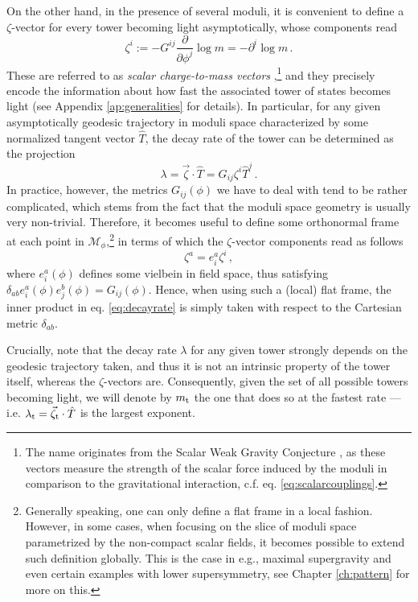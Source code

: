 On the other hand, in the presence of several moduli, it is convenient to define a $\zeta$-vector for every tower becoming light asymptotically, whose components read
%
\begin{equation}\label{eq:chargetomass}
	\zeta^i := - G^{i j} \frac{\partial}{\partial \phi^j} \log m= -\partial^i \log m\, .
\end{equation}
%
These are referred to as \emph{scalar charge-to-mass vectors} \cite{Calderon-Infante:2020dhm,Etheredge:2022opl,Etheredge:2023odp},\footnote{The name originates from the Scalar Weak Gravity Conjecture \cite{Palti_2017}, as these vectors measure the strength of the scalar force induced by the moduli in comparison to the gravitational interaction, c.f. eq. \eqref{eq:scalarcouplings}.} and they precisely encode the information about how fast the associated tower of states becomes light (see Appendix \ref{ap:generalities} for details). In particular, for any given asymptotically geodesic trajectory in moduli space characterized by some normalized tangent vector $\hat{T}$, the decay rate of the tower can be determined as the projection
%
\begin{equation}\label{eq:decayrate}
  \lambda=\vec{\zeta} \cdot \hat{T} = G_{ij}\zeta^i \hat{T}^j\, .
\end{equation}
%
In practice, however, the metrics $G_{ij}(\phi)$ we have to deal with tend to be rather complicated, which stems from the fact that the moduli space geometry is usually very non-trivial. Therefore, it becomes useful to define some orthonormal frame at each point in $\mathcal{M}_{\phi}$,\footnote{Generally speaking, one can only define a flat frame in a local fashion. However, in some cases, when focusing on the slice of moduli space parametrized by the non-compact scalar fields, it becomes possible to extend such definition globally. This is the case in e.g., maximal supergravity and even certain examples with lower supersymmetry, see Chapter \ref{ch:pattern} for more on this.} in terms of which the $\zeta$-vector components read as follows
%
\begin{equation} \label{eq:zeta-vectors}
  \zeta^{a} = e^{a}_{i} \zeta^i\, , 
\end{equation}
%
where $e^a_i(\phi)$ defines some vielbein in field space, thus satisfying $\delta_{ab} e^a_i(\phi) e^b_j(\phi) = G_{ij}(\phi)$. Hence, when using such a (local) flat frame, the inner product in eq. \eqref{eq:decayrate} is simply taken with respect to the Cartesian metric $\delta_{ab}$.
	
Crucially, note that the decay rate $\lambda$ for any given tower strongly depends on the geodesic trajectory taken, and thus it is not an intrinsic property of the tower itself, whereas the $\zeta$-vectors are. Consequently, given the set of all possible towers becoming light, we will denote by $m_{\rm t}$ the one that does so at the fastest rate --- i.e. $\lambda_{\rm t} = \vec{\zeta}_{\rm t} \cdot \hat T$ is the largest exponent.


